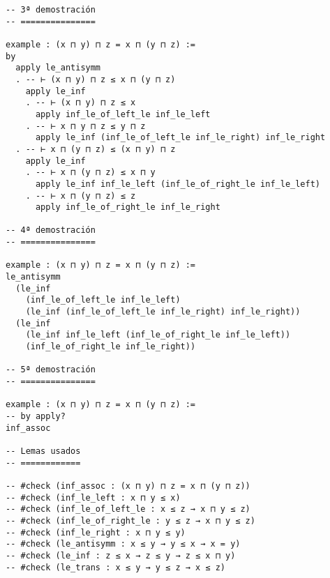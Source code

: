 \begin{verbatim}
-- 3ª demostración
-- ===============

example : (x ⊓ y) ⊓ z = x ⊓ (y ⊓ z) :=
by
  apply le_antisymm
  . -- ⊢ (x ⊓ y) ⊓ z ≤ x ⊓ (y ⊓ z)
    apply le_inf
    . -- ⊢ (x ⊓ y) ⊓ z ≤ x
      apply inf_le_of_left_le inf_le_left
    . -- ⊢ x ⊓ y ⊓ z ≤ y ⊓ z
      apply le_inf (inf_le_of_left_le inf_le_right) inf_le_right
  . -- ⊢ x ⊓ (y ⊓ z) ≤ (x ⊓ y) ⊓ z
    apply le_inf
    . -- ⊢ x ⊓ (y ⊓ z) ≤ x ⊓ y
      apply le_inf inf_le_left (inf_le_of_right_le inf_le_left)
    . -- ⊢ x ⊓ (y ⊓ z) ≤ z
      apply inf_le_of_right_le inf_le_right

-- 4ª demostración
-- ===============

example : (x ⊓ y) ⊓ z = x ⊓ (y ⊓ z) :=
le_antisymm
  (le_inf
    (inf_le_of_left_le inf_le_left)
    (le_inf (inf_le_of_left_le inf_le_right) inf_le_right))
  (le_inf
    (le_inf inf_le_left (inf_le_of_right_le inf_le_left))
    (inf_le_of_right_le inf_le_right))

-- 5ª demostración
-- ===============

example : (x ⊓ y) ⊓ z = x ⊓ (y ⊓ z) :=
-- by apply?
inf_assoc

-- Lemas usados
-- ============

-- #check (inf_assoc : (x ⊓ y) ⊓ z = x ⊓ (y ⊓ z))
-- #check (inf_le_left : x ⊓ y ≤ x)
-- #check (inf_le_of_left_le : x ≤ z → x ⊓ y ≤ z)
-- #check (inf_le_of_right_le : y ≤ z → x ⊓ y ≤ z)
-- #check (inf_le_right : x ⊓ y ≤ y)
-- #check (le_antisymm : x ≤ y → y ≤ x → x = y)
-- #check (le_inf : z ≤ x → z ≤ y → z ≤ x ⊓ y)
-- #check (le_trans : x ≤ y → y ≤ z → x ≤ z)
\end{verbatim}

